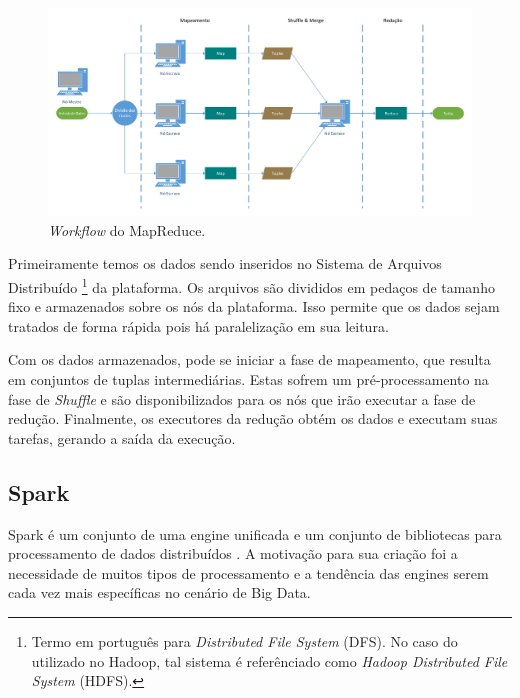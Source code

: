 \begin{figure}[ht]
 \centerline{\includegraphics[width=1\textwidth]{./img/mapreduce-workflow.pdf}}
 \caption{\emph{Workflow} do MapReduce.}
 \label{fig:mrworkflow}
\end{figure}

Primeiramente temos os dados sendo inseridos no Sistema de Arquivos Distribuído 
\footnote{Termo em português para \emph{Distributed File System} (DFS). No caso 
do utilizado no Hadoop, tal sistema é referênciado como \emph{Hadoop Distributed 
File System} (HDFS).} da plataforma. Os arquivos são divididos em pedaços de 
tamanho fixo e armazenados sobre os nós da plataforma. Isso permite que os dados 
sejam tratados de forma rápida pois há paralelização em sua leitura.

Com os dados armazenados, pode se iniciar a fase de mapeamento, que resulta em 
conjuntos de tuplas intermediárias. Estas sofrem um pré-processamento na fase 
de \emph{Shuffle} e são disponibilizados para os nós que irão executar a fase 
de redução. Finalmente, os executores da redução obtém os dados e executam suas 
tarefas, gerando a saída da execução.

\subsection{Spark} \label{ref:spark}

Spark é um conjunto de uma engine unificada e um conjunto de bibliotecas para 
processamento de dados distribuídos \cite{ref:sparkbook}. A motivação para sua 
criação foi a necessidade de muitos tipos de processamento e a tendência das 
engines serem cada vez mais específicas no cenário de Big Data.

